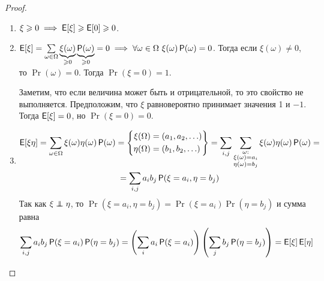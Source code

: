 \begin{proof}
\begin{enumerate}
        \item \(\xi \geq 0 \implies \E[\xi] \geq \E[0] \geq 0\).
        
        \item \(\E[\xi] = \sum\limits_{\omega \in \Omega} \underbrace{\xi(\omega)}_{\geq 0}\underbrace{\Pr(\omega)}_{\geq 0} = 0 \implies \forall \omega \in \Omega\ \xi(\omega)\Pr(\omega) = 0\). Тогда если \(\xi(\omega) \neq 0\), то \(\Pr(\omega) = 0\). Тогда \(\Pr(\xi = 0) = 1\).
        
        Заметим, что если величина может быть и отрицательной, то это свойство не выполняется. Предположим, что \(\xi\) равновероятно принимает значения 1 и \(-1\). Тогда \(\E[\xi] = 0\), но \(\Pr(\xi = 0) = 0\).
        
        \item 
        \begin{multline*}
        \E[\xi\eta] =
        \sum_{\omega \in \Omega}\xi(\omega)\eta(\omega)\Pr(\omega) =
        \left\{
        \begin{aligned}
        \xi(\Omega) &= (a_1, a_2, \ldots)\\ 
        \eta(\Omega) &= (b_1, b_2, \ldots)
        \end{aligned}
        \right\} =
        \sum_{i, j}\sum_{
            \substack{
                \omega:\\
                \xi(\omega) = a_i\\
                \eta(\omega) = b_j
            }
        }\xi(\omega)\eta(\omega)\Pr(\omega) =\\=
        \sum_{i, j}a_ib_j\Pr(\xi = a_i, \eta = b_j)
        \end{multline*}
        Так как \(\xi \independent \eta\), то \(\Pr(\xi = a_i, \eta = b_j) = \Pr(\xi = a_i)\Pr(\eta = b_j)\) и сумма равна
        \begin{multline*}
        \sum_{i, j}a_ib_j\Pr(\xi = a_i)\Pr(\eta = b_j)=
        \left(\sum_{i}a_i\Pr(\xi = a_i)\right)\left(\sum_{j}b_j\Pr(\eta = b_j)\right)=
        \E[\xi]\E[\eta]
        \end{multline*}
     \end{enumerate}   
\end{proof}

